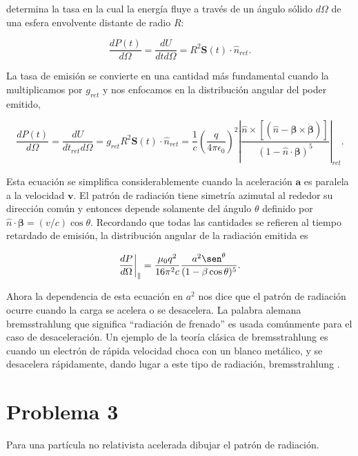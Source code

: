 \documentclass[a4paper,11pt]{article}
\numberwithin{equation}{section}
\newcommand{\zerodel}{.\kern-\nulldelimiterspace}
\begin{document}
determina la tasa en la cual la energía fluye a través de un ángulo sólido $d\Omega$ 
de una esfera envolvente distante de radio $R$:

\begin{equation}
 \frac{dP(t)}{d\Omega} = \frac{dU}{dtd\Omega} = R^2 \mathbf{S}(t) \cdot \hat{n}_{ret}.
\end{equation}

La tasa de emisión se convierte en una cantidad más fundamental cuando 
la multiplicamos por $g_{ret}$ y nos enfocamos en la distribución angular del 
poder emitido, 

\begin{equation}
 \frac{dP(t)}{d\Omega} = \frac{dU}{dt_{ret}d\Omega} = g_{ret} R^2 \mathbf{S}(t) 
 \cdot \hat{n}_{ret} = \frac{1}{c}\left(\frac{q}{4\pi\epsilon_0}\right)^2 
 \left|\frac{\hat{n} \times [(\hat{n} - 
 \pmb{\beta} \times \dot{\pmb{\beta}})]}{(1 - \hat{n}\cdot \pmb{\beta})^5}\right|_{ret}.
\end{equation}

Esta ecuación se simplifica considerablemente cuando la aceleración $\mathbf{a}$ es 
paralela a la velocidad $\mathbf{v}$. El patrón de radiación tiene simetría 
azimutal al rededor su dirección común y entonces depende solamente del 
ángulo $\theta$ definido por $\hat{n} \cdot \pmb{\beta} = (v/c)\cos{\theta}$. 
Recordando que todas las cantidades se refieren al tiempo retardado de 
emisión, la distribución angular de la radiación emitida es 

\begin{equation}
 \left\zerodel \frac{dP}{d\Omega}\right|_{\parallel} = \frac{\mu_0q^2}{16\pi^2c} 
 \frac{a^2\sen^{\theta}}{(1 - \beta\cos{\theta})^5}.
\end{equation}

Ahora la dependencia de esta ecuación en $a^2$ nos dice que el patrón de radiación 
ocurre cuando la carga se acelera o se desacelera. La palabra alemana bremsstrahlung 
que significa ``radiación de frenado'' es usada comúnmente para el caso de desaceleración. 
Un ejemplo de la teoría clásica de bremsstrahlung es cuando un electrón de rápida 
velocidad choca con un blanco metálico, y se desacelera rápidamente, dando lugar a 
este tipo de radiación, bremsstrahlung \cite{griffiths}.

\section{Problema 3}

Para una partícula no relativista acelerada dibujar el patrón de radiación.
\end{document}
